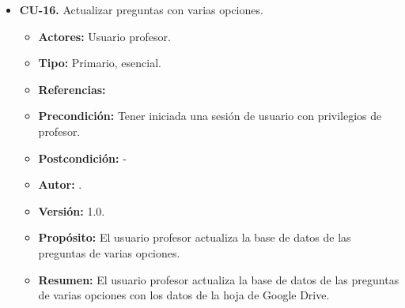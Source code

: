 \begin{itemize}
  \item \textbf{CU-16.} Actualizar preguntas con varias opciones.
  \begin{itemize}
    \item \textbf{Actores:} Usuario profesor.
    \item \textbf{Tipo:} Primario, esencial.
    \item \textbf{Referencias:}
    \item \textbf{Precondición:} Tener iniciada una sesión de usuario con privilegios de profesor.
    \item \textbf{Postcondición:} - 
    \item \textbf{Autor:} \autor.
    \item \textbf{Versión:} 1.0.
    \item \textbf{Propósito:} El usuario profesor actualiza la base de datos de las preguntas de varias opciones.
    \item \textbf{Resumen:} El usuario profesor actualiza la base de datos de las preguntas de varias opciones con los datos de la hoja de Google Drive.


\end{itemize}
\end{itemize}
